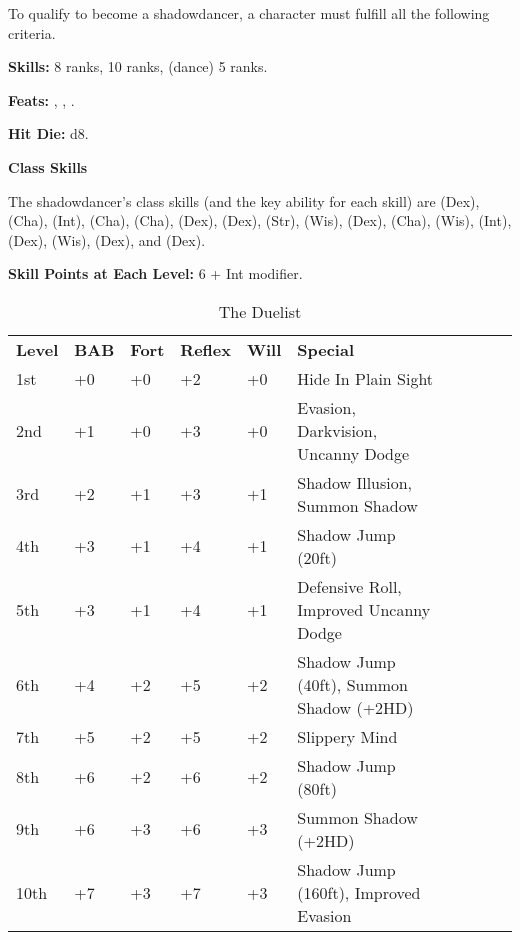 
\Requirements

To qualify to become a shadowdancer, a character must fulfill all the following 
criteria.

\textbf{Skills:}  8 ranks,  10 ranks,  (dance) 5 ranks.

\textbf{Feats:} , , .

\Basics

\textbf{Hit Die:} d8.

\textbf{Class Skills}

The shadowdancer's class skills (and the key ability for each skill) are  
(Dex),  (Cha),  (Int),  (Cha),  (Cha), 
(Dex),  (Dex),  (Str),  (Wis),  (Dex), 
(Cha),  (Wis),  (Int),  (Dex),  (Wis),  
(Dex), and  (Dex).

\textbf{Skill Points at Each Level:} 6 + Int modifier.

\begin{table}[htb]
\caption{The Duelist}
\centering
\begin{tabular}{*{6}{l}*{4}{c}}
\textbf{Level} & \textbf{BAB} & \textbf{Fort} & \textbf{Reflex} & \textbf{Will} & \textbf{Special}\\
1st & +0 & +0 & +2 & +0 & Hide In Plain Sight \\
2nd & +1 & +0 & +3 & +0 & Evasion, Darkvision, Uncanny Dodge\\
3rd & +2 & +1 & +3 & +1 & Shadow Illusion, Summon Shadow\\
4th & +3 & +1 & +4 & +1 & Shadow Jump (20ft)\\
5th & +3 & +1 & +4 & +1 & Defensive Roll, Improved Uncanny Dodge\\
6th & +4 & +2 & +5 & +2 & Shadow Jump (40ft), Summon Shadow (+2HD)\\
7th & +5 & +2 & +5 & +2 & Slippery Mind\\
8th & +6 & +2 & +6 & +2 & Shadow Jump (80ft)\\
9th & +6 & +3 & +6 & +3 & Summon Shadow (+2HD)\\
10th & +7 & +3 & +7 & +3 & Shadow Jump (160ft), Improved Evasion\\
\end{tabular}
\end{table}


